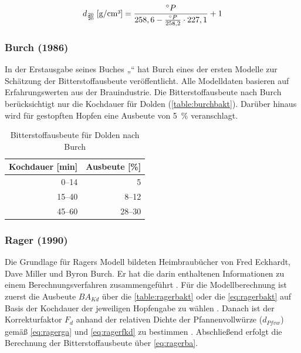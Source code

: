 \documentclass[a4paper,parskip=half]{scrartcl}
\newcommand{\BAKt}{{\mathit{BA}}_{\mathit{Kd}}}
\newcommand{\uden}{\:[\text{g/cm³}]}
\newcommand{\FKd}{F_{\mathit{d}}}
\newcommand{\dPfvw}{d_\mathit{Pfvw}}
\begin{document}
\begin{equation}
d_{\frac{20}{20}} \uden = \frac{\degree P}{258,6 - \frac{\degree P}{258,2} \cdot 227,1} + 1
\label{eq:calcptosg}
\end{equation}

\subsubsection*{Burch (1986)}

In der Erstausgabe seines Buches „“ hat Burch eines der ersten Modelle zur Schätzung der Bitterstoffausbeute veröffentlicht. Alle Modelldaten basieren auf Erfahrungswerten aus der Brauindustrie. 
Die Bitterstoffausbeute nach Burch berücksichtigt nur die Kochdauer für Dolden (\autoref{table:burchbakt}). Darüber hinaus wird für gestopften Hopfen eine Ausbeute von 5~\% veranschlagt. \parencite[28-33]{Burch1992}

\begin{table}[H]
\centering
\begin{tabular}{rr}
\toprule
\multicolumn{1}{c}{\textbf{Kochdauer [min]}} & \multicolumn{1}{c}{\textbf{Ausbeute [\%]}} \\
\midrule
0–14  & 5 \\
15–40 & 8–12 \\
45–60 & 28–30 \\
\bottomrule
\end{tabular}
\caption{Bitterstoffausbeute für Dolden nach Burch \parencite[33]{Burch1992}}
\label{table:burchbakt}
\end{table}

\subsubsection*{Rager (1990)}

Die Grundlage für Ragers Modell bildeten Heimbraubücher von Fred Eckhardt, Dave Miller und Byron Burch. Er hat die darin enthaltenen Informationen zu einem Berechnungsverfahren zusammengeführt \parencite[53]{Rager1990}. 
Für die Modellberechnung ist zuerst die Ausbeute $\BAKt$ über die \autoref{table:ragerbakt} oder die \autoref{eq:ragerbakt} auf Basis der Kochdauer der jeweiligen Hopfengabe zu wählen \parencite{Steinmeyer2021}. Danach ist der Korrekturfaktor $\FKd$ anhand der relativen Dichte der Pfannenvollwürze ($\dPfvw$) gemäß \autoref{eq:ragerga} und \autoref{eq:ragerfkd} zu bestimmen \parencite[53]{Rager1990}. Abschließend erfolgt die Berechnung der Bitterstoffausbeute über \autoref{eq:ragerba}.
\end{document}
